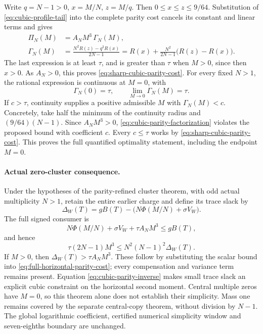 Write \(q=N-1>0\), \(x=M/N\), \(z=M/q\).
Then \(0\le x\le z\le9/64\).  Substitution of
\eqref{eq:cubic-profile-tail} into the complete parity cost cancels
its constant and linear terms and gives
\begin{align}
 \Pi_N(M)&=A_NM^3\,\Gamma_N(M),\label{eq:cubic-parity-factorization}\\
 \Gamma_N(M)&=\frac{N^2R(z)-q^2R(x)}{2N-1}
 =R(x)+\frac{N^2}{2N-1}\bigl(R(z)-R(x)\bigr).
 \label{eq:cubic-parity-normalized}
\end{align}
The last expression is at least \(\tau\), and is greater than
\(\tau\) when \(M>0\), since then \(x>0\).
As \(A_N>0\), this proves \eqref{eq:sharp-cubic-parity-cost}.
For every fixed \(N>1\), the rational expression is continuous at
\(M=0\), with
\[
 \Gamma_N(0)=\tau,\qquad
 \lim_{M\to0}\Gamma_N(M)=\tau.
\]
If \(c>\tau\), continuity supplies a positive admissible \(M\)
with \(\Gamma_N(M)<c\).  Concretely, take half the minimum of the
continuity radius and \((9/64)(N-1)\).  Since \(A_NM^3>0\),
\eqref{eq:cubic-parity-factorization} violates the proposed bound
with coefficient \(c\).  Every \(c\le\tau\) works by
\eqref{eq:sharp-cubic-parity-cost}.  This proves the full quantified
optimality statement, including the endpoint \(M=0\).

\paragraph{Actual zero-cluster consequence.}
Under the hypotheses of the parity-refined cluster theorem, with
odd actual multiplicity \(N>1\), retain the entire earlier charge
and define its trace slack by
\[
 \Delta_W(T)=gB(T)-\bigl(N\Phi(M/N)+\sigma V_W\bigr).
\]
The full signed consumer is
\begin{equation}\label{eq:cubic-parity-zeta-budget}
 N\Phi(M/N)+\sigma V_W+\tau A_NM^3\le gB(T),
\end{equation}
and hence
\begin{equation}\label{eq:cubic-parity-inverse}
 \tau(2N-1)M^3\le N^2(N-1)^2\Delta_W(T).
\end{equation}
If \(M>0\), then \(\Delta_W(T)>\tau A_NM^3\).
These follow by substituting the scalar bound into
\eqref{eq:full-horizontal-parity-cost}; every compensation and variance
term remains present.  Equation \eqref{eq:cubic-parity-inverse} makes
small trace slack an explicit cubic constraint on the horizontal second
moment.  Central multiple zeros have \(M=0\), so this theorem alone
does not establish their simplicity.  Mass one remains covered by the
separate central-copy theorem, without division by \(N-1\).
The global logarithmic coefficient, certified numerical simplicity
window and seven-eighths boundary are unchanged.

